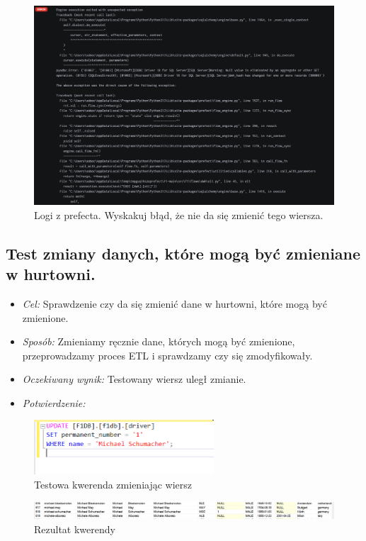 \documentclass[12pt]{article}
\begin{document}
\begin{figure}[H]
    \centering   \includegraphics[width=\textwidth]{test22.png}
    \caption{Logi z prefecta. Wyskakuj błąd, że nie da się zmienić tego wiersza.}
\end{figure}


\subsection{Test zmiany danych, które mogą być zmieniane w hurtowni.}
\begin{itemize}
    \item \textit{Cel:} Sprawdzenie czy da się zmienić dane w hurtowni, które mogą być zmienione.
    \item \textit{Sposób:}
   Zmieniamy ręcznie dane, których mogą być zmienione, przeprowadzamy proces ETL i sprawdzamy czy się zmodyfikowały.
     \item \textit{Oczekiwany wynik:}
     Testowany wiersz uległ zmianie.
      \item \textit{Potwierdzenie:}
\end{itemize}

\begin{figure}[H]
    \centering   \includegraphics[width=0.6\textwidth]{test18.png}
    \caption{Testowa kwerenda zmieniając wiersz}
\end{figure}

\begin{figure}[H]
    \centering   \includegraphics[width=\textwidth]{test17.png}
    \caption{Rezultat kwerendy}
\end{figure}
\end{document}
